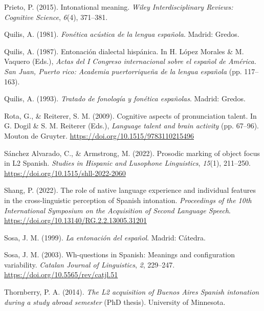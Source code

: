 \documentclass[]{article}
\newlength{\cslhangindent}
\newenvironment{CSLReferences}[2] %
 {%
  \setlength{\parindent}{0pt}
  \ifodd #1 \everypar{\setlength{\hangindent}{\cslhangindent}}\ignorespaces\fi
  \ifnum #2 > 0
  \setlength{\parskip}{#2\baselineskip}
  \fi
 }%
 {}
\begin{document}
\begin{CSLReferences}{1}{0}
\leavevmode{}%
Prieto, P. (2015). Intonational meaning. \emph{Wiley Interdisciplinary Reviews: Cognitive Science}, \emph{6}(4), 371--381.

\leavevmode{}%
Quilis, A. (1981). \emph{Fon{é}tica ac{ú}stica de la lengua espa{ñ}ola}. Madrid: Gredos.

\leavevmode{}%
Quilis, A. (1987). Entonación dialectal hispánica. In H. López Morales \& M. Vaquero (Eds.), \emph{{A}ctas del {I} {C}ongreso internacional sobre el español de {A}mérica. {S}an {J}uan, {P}uerto rico: {A}cademia puertorriqueña de la lengua española} (pp. 117--163).

\leavevmode{}%
Quilis, A. (1993). \emph{Tratado de fonología y fonética españolas}. Madrid: Gredos.

\leavevmode{}%
Rota, G., \& Reiterer, S. M. (2009). Cognitive aspects of pronunciation talent. In G. Dogil \& S. M. Reiterer (Eds.), \emph{Language talent and brain activity} (pp. 67--96). Mouton de Gruyter. \url{https://doi.org/10.1515/9783110215496}

\leavevmode{}%
Sánchez Alvarado, C., \& Armstrong, M. (2022). Prosodic marking of object focus in {L}2 {S}panish. \emph{Studies in Hispanic and Lusophone Linguistics}, \emph{15}(1), 211--250. \url{https://doi.org/10.1515/shll-2022-2060}

\leavevmode{}%
Shang, P. (2022). The role of native language experience and individual features in the cross-linguistic perception of {S}panish intonation. \emph{Proceedings of the 10th International Symposium on the Acquisition of Second Language Speech}. \url{https://doi.org/10.13140/RG.2.2.13005.31201}

\leavevmode{}%
Sosa, J. M. (1999). \emph{La entonación del español}. Madrid: Cátedra.

\leavevmode{}%
Sosa, J. M. (2003). Wh-questions in {S}panish: Meanings and configuration variability. \emph{Catalan Journal of Linguistics}, \emph{2}, 229--247. \url{https://doi.org/10.5565/rev/catjl.51}

\leavevmode{}%
Thornberry, P. A. (2014). \emph{The {L}2 acquisition of {B}uenos {A}ires {S}panish intonation during a study abroad semester} (PhD thesis). University of Minnesota.


\end{CSLReferences}
\end{document}
